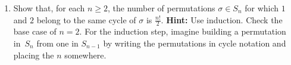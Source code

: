 \documentclass[11pt]{article}
\begin{document}
\begin{enumerate}
\item Show that, for each $n \geq 2$, the number of permutations $\sigma \in S_n$ for which $1$ and $2$ belong to the same cycle of $\sigma$ is $\frac{n!}{2}$. {\bf Hint:} Use induction. Check the base case of $n=2$. For the induction step, imagine building a permutation in~$S_n$ from one in $S_{n-1}$ by writing the permutations in cycle notation and placing the $n$ somewhere.

\end{enumerate}
\end{document}
